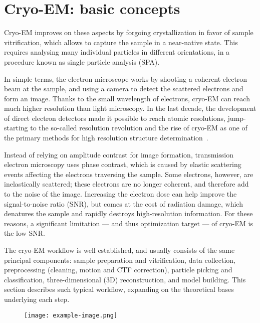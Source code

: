 
\localtableofcontents

\section{Cryo-EM: basic concepts}

Cryo-EM improves on these aspects by forgoing crystallization in favor of sample vitrification, which allows to capture the sample in a near-native state. This requires analysing many individual particles in different orientations, in a procedure known as single particle analysis (SPA).

In simple terms, the electron microscope works by shooting a coherent electron beam at the sample, and using a camera to detect the scattered electrons and form an image.
Thanks to the small wavelength of electrons, cryo-EM can reach much higher resolution than light microscopy.
In the last decade, the development of direct electron detectors made it possible to reach atomic resolutions, jump-starting to the so-called resolution revolution and the rise of cryo-EM as one of the primary methods for high resolution structure determination~\cite{faruqiCCDDetectorsHighresolution2000}.

Instead of relying on amplitude contrast for image formation, transmission electron microscopy uses phase contrast, which is caused by elastic scattering events affecting the electrons traversing the sample.
Some electrons, however, are inelastically scattered; these electrons are no longer coherent, and therefore add to the noise of the image.
Increasing the electron dose can help improve the signal-to-noise ratio (SNR), but comes at the cost of radiation damage, which denatures the sample and rapidly destroys high-resolution information.
For these reasons, a significant limitation --- and thus optimization target --- of cryo-EM is the low SNR.

The cryo-EM workflow is well established, and usually consists of the same principal components: sample preparation and vitrification, data collection, preprocessing (cleaning, motion and CTF correction), particle picking and classification, three-dimensional (3D) reconstruction, and model building.
This section describes such typical workflow, expanding on the theoretical bases underlying each step.

\begin{figure}[ht]
    \centering
    \texttt{[image: example-image.png]}
    \label{fig:em_workflow}
\end{figure}


